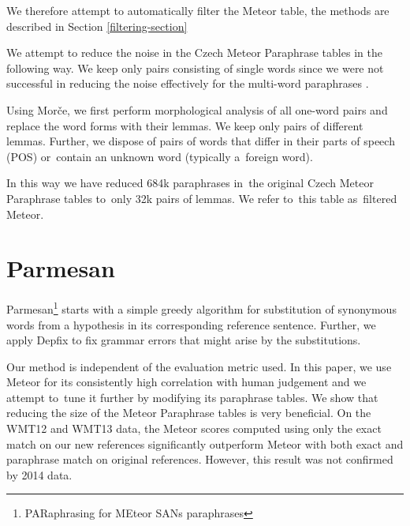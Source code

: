 \documentclass[11pt]{article}
\begin{document}
We therefore attempt to automatically filter the Meteor table, the methods are described in Section 
\ref{filtering-section}





We attempt to reduce the noise in the Czech Meteor Paraphrase tables in the following way. We 
keep only pairs consisting of single words since we were not successful in reducing the noise
effectively for the multi-word paraphrases \cite{barancikova2014}. 

Using Morče, we first perform morphological analysis of all one-word pairs and replace 
the word forms with their lemmas.  We keep only pairs of different lemmas. Further, we
 dispose of pairs of words that differ in their parts of speech (POS) or~contain an 
unknown word (typically a~foreign word). 

In this way we have reduced 684k paraphrases in~the original Czech Meteor Paraphrase tables 
to~only 32k pairs of lemmas. We refer to~this table as~filtered Meteor.


\section{Parmesan}


Parmesan\footnote{PARaphrasing for MEteor SANs paraphrases} starts with a simple greedy algorithm for 
substitution of synonymous words from a hypothesis in its corresponding reference sentence. Further, 
we apply Depfix \cite{depfix} to fix grammar errors that might arise by the substitutions.

Our method is independent of the evaluation metric used. In this paper, we use Meteor for its consistently 
high correlation with human judgement and we attempt to~tune it further by modifying its paraphrase tables. 
We show that reducing the size of the Meteor Paraphrase tables is very beneficial. On the WMT12 and WMT13 data,
the Meteor scores computed using only the exact match on our new references significantly outperform Meteor 
with both exact and paraphrase match on original references. However, this result was not confirmed by 2014 
data. %
\end{document}
